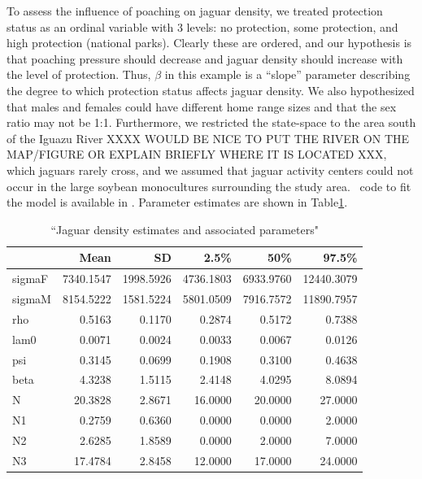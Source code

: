 To assess the influence of poaching on jaguar density, we treated
protection status as an ordinal variable with 3 levels: no protection,
some protection, and high protection (national parks). Clearly these are ordered, and our
hypothesis is that poaching pressure should decrease and jaguar
density should increase with the level of
protection. Thus, $\beta$ in this example is a ``slope''
parameter describing the degree to which protection status affects
jaguar density. We also hypothesized that males and females could have
different home range sizes and that the sex ratio may not be
1:1. Furthermore, we restricted the state-space to the
area south of the Iguazu River XXXX WOULD BE NICE TO PUT THE RIVER ON THE MAP/FIGURE OR EXPLAIN BRIEFLY WHERE IT IS LOCATED XXX, which jaguars rarely cross, and we
assumed that jaguar activity centers could not occur in
the large soybean monocultures surrounding the study area.
\R~code to fit the model is available in
\scrbook. Parameter estimates are shown in Table\ref{ch9.tab.jagposts}.
\begin{table}
\caption{``Jaguar density estimates and associated parameters"}
\begin{tabular}{lrrrrr}
\hline
& Mean & SD & 2.5\% & 50\% & 97.5\% \\
\hline
 sigmaF &  7340.1547 &  1998.5926 &  4736.1803 &  6933.9760 & 12440.3079 \\
 sigmaM &  8154.5222 &  1581.5224 &  5801.0509 &  7916.7572 & 11890.7957 \\
 rho &     0.5163 &     0.1170 &     0.2874 &     0.5172 &     0.7388 \\
 lam0 &     0.0071 &     0.0024 &     0.0033 &     0.0067 &     0.0126 \\
 psi &     0.3145 &     0.0699 &     0.1908 &     0.3100 &     0.4638 \\
 beta &     4.3238 &     1.5115 &     2.4148 &     4.0295 &     8.0894 \\
 N &    20.3828 &     2.8671 &    16.0000 &    20.0000 &    27.0000 \\
 N1 &     0.2759 &     0.6360 &     0.0000 &     0.0000 &     2.0000 \\
 N2 &     2.6285 &     1.8589 &     0.0000 &     2.0000 &     7.0000 \\
 N3 &    17.4784 &     2.8458 &    12.0000 &    17.0000 &    24.0000 \\
\hline
\end{tabular}
\label{ch9.tab.jagposts}
\end{table}


